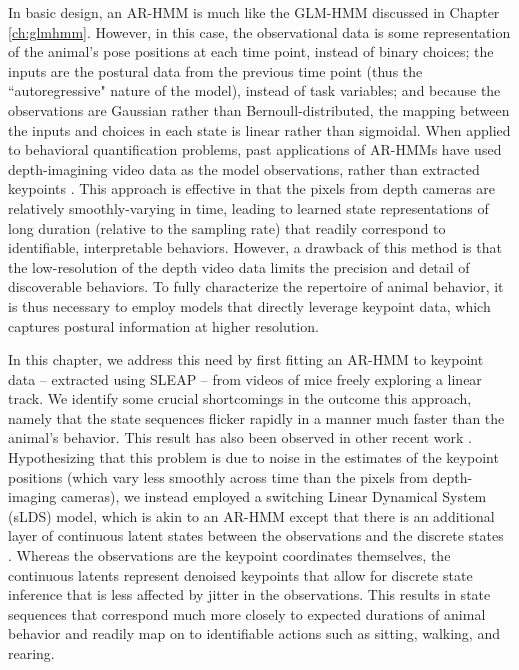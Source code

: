 In basic design, an AR-HMM is much like the GLM-HMM discussed in Chapter \ref{ch:glmhmm}. However, in this case, the observational data is some representation of the animal's pose positions at each time point, instead of binary choices; the inputs are the postural data from the previous time point (thus the ``autoregressive" nature of the model), instead of task variables; and because the observations are Gaussian rather than Bernoull-distributed, the mapping between the inputs and choices in each state is linear rather than sigmoidal. When applied to behavioral quantification problems, past applications of AR-HMMs have used depth-imagining video data as the model observations, rather than extracted keypoints \cite{wiltschko_mapping_2015, markowitz_striatum_2018, wiltschko_revealing_2020}. This approach is effective in that the pixels from depth cameras are relatively smoothly-varying in time, leading to learned state representations of long duration (relative to the sampling rate) that readily correspond to identifiable, interpretable behaviors. However, a drawback of this method is that the low-resolution of the depth video data limits the precision and detail of discoverable behaviors. To fully characterize the repertoire of animal behavior, it is thus necessary to employ models that directly leverage keypoint data, which captures postural information at higher resolution. 

In this chapter, we address this need by first fitting an AR-HMM to keypoint data -- extracted using SLEAP \cite{pereira_sleap_2022} -- from videos of mice freely exploring a linear track. We identify some crucial shortcomings in the outcome this approach, namely that the state sequences flicker rapidly in a manner much faster than the animal's behavior. This result has also been observed in other recent work \cite{wu_deep_2020, luxem_identifying_2022}. Hypothesizing that this problem is due to noise in the estimates of the keypoint positions (which vary less smoothly across time than the pixels from depth-imaging cameras), we instead employed a switching Linear Dynamical System (sLDS) model, which is akin to an AR-HMM except that there is an additional layer of continuous latent states between the observations and the discrete states \cite{ackerson_state_1970, chang_state_1978, fox_nonparametric_2008, murphy_machine_2012, linderman_bayesian_2017}. Whereas the observations are the keypoint coordinates themselves, the continuous latents represent denoised keypoints that allow for discrete state inference that is less affected by jitter in the observations. This results in state sequences that correspond much more closely to expected durations of animal behavior \cite{wiltschko_mapping_2015} and readily map on to identifiable actions such as sitting, walking, and rearing. 

